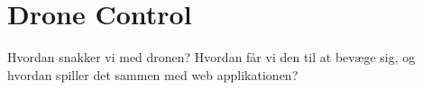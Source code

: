 \chapter{Drone Control}

Hvordan snakker vi med dronen? Hvordan får vi den til at bevæge sig, og hvordan spiller det sammen med web applikationen? 
